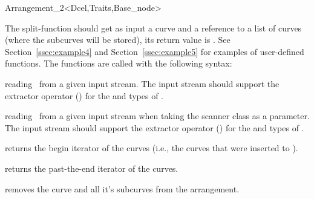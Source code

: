 \begin{ccRefClass}{Arrangement_2<Dcel,Traits,Base_node>}
\begin{ccAdvanced}
        The split-function should get as input a curve and a reference to
        a list of curves (where the subcurves will be stored), its return
        value is . See Section~\ref{ssec:example4}
        and Section~\ref{ssec:example5} for examples
        of user-defined functions.
        The functions are called with the following
        syntax:


\end{ccAdvanced}

\begin{ccAdvanced}

{reading \ccRefName\ from a given input stream.
 The input stream should support the extractor operator (\ccc{>>}) for the 
  and  types of . } 

{reading \ccRefName\ from a given input stream when taking the scanner class 
 as a parameter.
 The input stream should support the extractor operator (\ccc{>>}) for the 
  and  types of . }

\end{ccAdvanced}    



    { returns the begin iterator of the curves (i.e., the
       curves that were inserted to \ccVar).}

    { returns the past-the-end iterator of the curves.}

    {removes the curve and all it's subcurves from the arrangement.}



\end{ccRefClass}
